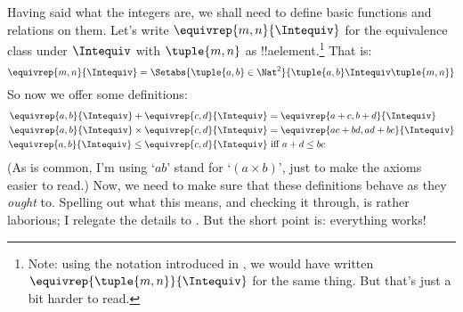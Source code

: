 \documentclass[../../../include/open-logic-section]{subfiles}
\begin{document}
Having said what the integers are, we shall need to define basic functions and relations on them. Let's write $\equivrep{m, n}{\Intequiv}$ for the equivalence class under $\Intequiv$ with $\tuple{m, n}$ as !!a{element}.\footnote{Note: using the notation introduced in , we would have written $\equivrep{\tuple{m,n}}{\Intequiv}$ for the same thing. But that's just a bit harder to read.} That is: 
	$$\equivrep{m, n}{\Intequiv} = \Setabs{\tuple{a, b} \in \Nat^2}{\tuple{a, b}\Intequiv \tuple{m, n}}$$
So now we offer some definitions:
	\begin{align*}
		\equivrep{a, b}{\Intequiv} + \equivrep{c, d}{\Intequiv} &= \equivrep{a + c, b + d}{\Intequiv}\\
		\equivrep{a, b}{\Intequiv} \times \equivrep{c, d}{\Intequiv} &= \equivrep{a c + b  d, a  d + b c}{\Intequiv}\\
		\equivrep{a, b}{\Intequiv} \leq \equivrep{c, d}{\Intequiv} &\text{ iff }a + d \leq b c
	\end{align*}	
(As is common, I'm using `$ab$' stand for `$(a \times b)$', just to make the axioms easier to read.) Now, we need to make sure that these definitions behave as they \emph{ought} to. Spelling out what this means, and checking it through, is rather laborious; I relegate the details to . But the short point is: everything works! 
\end{document}

